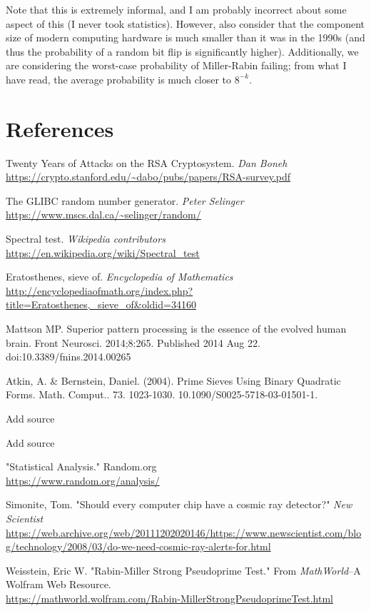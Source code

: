\documentclass{article}
\begin{document}
Note that this is extremely informal, and I am probably incorrect about some aspect of this (I never took statistics). However, also consider that the component size of modern computing hardware is much smaller than it was in the 1990s (and thus the probability of a random bit flip is significantly higher). Additionally, we are considering the worst-case probability of Miller-Rabin failing; from what I have read, the average probability is much closer to $8^{-k}$.


\clearpage
\section{References}
\begin{thebibliography}{6}
Twenty Years of Attacks on the RSA Cryptosystem.
\textit{Dan Boneh}
\\\url{https://crypto.stanford.edu/~dabo/pubs/papers/RSA-survey.pdf}

The GLIBC random number generator.
\textit{Peter Selinger}
\\\url{https://www.mscs.dal.ca/~selinger/random/}

Spectral test.
\textit{Wikipedia contributors}
\\\url{https://en.wikipedia.org/wiki/Spectral_test}

Eratosthenes, sieve of.
\textit{Encyclopedia of Mathematics}\\
\url{http://encyclopediaofmath.org/index.php?title=Eratosthenes,_sieve_of&oldid=34160}

Mattson MP. Superior pattern processing is the essence of the evolved human brain. Front Neurosci. 2014;8:265. Published 2014 Aug 22. doi:10.3389/fnins.2014.00265

Atkin, A. \& Bernstein, Daniel. (2004). Prime Sieves Using Binary Quadratic Forms. Math. Comput.. 73. 1023-1030. 10.1090/S0025-5718-03-01501-1. 

Add source

Add source

"Statistical Analysis." Random.org
\\\url{https://www.random.org/analysis/}

Simonite, Tom. "Should every computer chip have a cosmic ray detector?" \textit{New Scientist}
\\\url{https://web.archive.org/web/20111202020146/https://www.newscientist.com/blog/technology/2008/03/do-we-need-cosmic-ray-alerts-for.html}

Weisstein, Eric W. "Rabin-Miller Strong Pseudoprime Test." From \textit{MathWorld}--A Wolfram Web Resource.
\\\url{https://mathworld.wolfram.com/Rabin-MillerStrongPseudoprimeTest.html}
\end{thebibliography}
         
\end{document}
